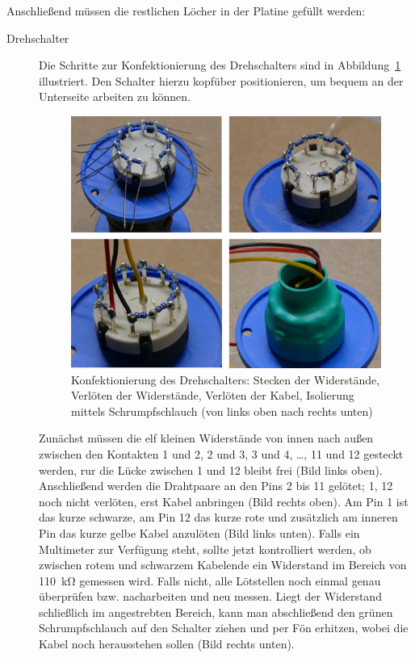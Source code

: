\documentclass[paper=a4, open=any]{scrbook}
\begin{document}
				Anschließend müssen die restlichen Löcher in der Platine gefüllt werden:

				\begin{description}
					\item[Drehschalter] Die Schritte zur Konfektionierung des Drehschalters sind in Abbildung~\ref{fig:drehschalter} illustriert. Den Schalter hierzu kopfüber positionieren, um bequem an der Unterseite arbeiten zu können.

					      \begin{figure}
						      \centering\includegraphics[width=.8\textwidth]{Drehschalter}
						      \caption{Konfektionierung des Drehschalters: Stecken der Widerstände, Verlöten der Widerstände, Verlöten der Kabel, Isolierung mittels Schrumpfschlauch (von links oben nach rechts unten)}
						      \label{fig:drehschalter}
					      \end{figure}

					      Zunächst müssen die elf kleinen Widerstände von innen nach außen zwischen den Kontakten 1 und 2, 2 und 3, 3 und 4, \dots, 11 und 12 gesteckt werden, rur die Lücke zwischen 1 und 12 bleibt frei (Bild links oben). Anschließend werden die Drahtpaare an den Pins 2 bis 11 gelötet; 1, 12 noch nicht verlöten, erst Kabel anbringen (Bild rechts oben). Am Pin 1 ist das kurze schwarze, am Pin 12 das kurze rote und zusätzlich am inneren Pin das kurze gelbe Kabel anzulöten (Bild links unten). Falls ein Multimeter zur Verfügung steht, sollte jetzt kontrolliert werden, ob zwischen rotem und schwarzem Kabelende ein Widerstand im Bereich von \SI{110}{\kilo\ohm} gemessen wird. Falls nicht, alle Lötstellen noch einmal genau überprüfen bzw. nacharbeiten und neu messen. Liegt der Widerstand schließlich im angestrebten Bereich, kann man abschließend den grünen Schrumpfschlauch auf den Schalter ziehen und per Fön erhitzen, wobei die Kabel noch herausstehen sollen (Bild rechts unten).


\end{description}
\end{document}
